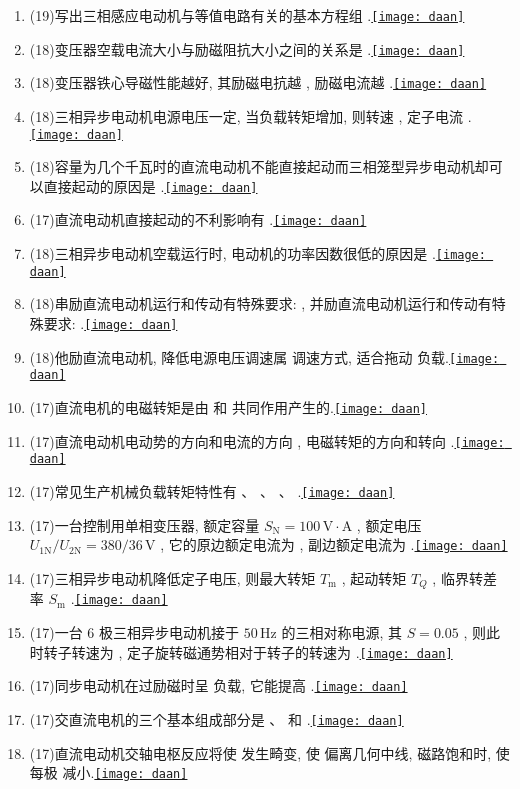 \documentclass[lang=cn,11pt,marginpar=margintrue]{elegantbook}%
\newcommand{\daan}[1]{\hfill\hyperref[#1]{\texttt{[image: daan]}}}
\newcommand{\xiahua}[1]{ \underline{\hspace{#1 pc}} }
\newcommand{\zt}[1]{\,\mathrm{#1}}
\newcommand{\NN}{\mathrm{N}}
\begin{document}
\begin{enumerate}
	\xiahua{8}.\daan{tk:30}
	\item (19)写出三相感应电动机与等值电路有关的基本方程组\xiahua{8}.\daan{tk:31}
	\item (18)变压器空载电流大小与励磁阻抗大小之间的关系是\xiahua{4}.\daan{tk:32}
	\item (18)变压器铁心导磁性能越好, 其励磁电抗越\xiahua{4}, 励磁电流越\xiahua{4}.\daan{tk:33}
	\item (18)三相异步电动机电源电压一定, 当负载转矩增加, 则转速\xiahua{4}, 定子电流\xiahua{4}.\daan{tk:34}
	\item (18)容量为几个千瓦时的直流电动机不能直接起动而三相笼型异步电动机却可以直接起动的原因是\xiahua{8}.\daan{tk:35}
	\item (17)直流电动机直接起动的不利影响有\xiahua{8}.\daan{tk:36}
	\item (18)三相异步电动机空载运行时, 电动机的功率因数很低的原因是\xiahua{5}.\daan{tk:37}
	\item (18)串励直流电动机运行和传动有特殊要求:\xiahua{8}, 并励直流电动机运行和传动有特殊要求:\xiahua{8}.\daan{tk:38}
	\item (18)他励直流电动机, 降低电源电压调速属\xiahua{3}调速方式, 适合拖动\xiahua{3}负载.\daan{tk:39}
	\item (17)直流电机的电磁转矩是由\xiahua{4}和\xiahua{4}共同作用产生的.\daan{tk:40}
	\item (17)直流电动机电动势的方向和电流的方向\xiahua{4}, 电磁转矩的方向和转向\xiahua{4}.\daan{tk:41}
	\item (17)常见生产机械负载转矩特性有\xiahua{5}、\xiahua{5}、\xiahua{5}、\xiahua{5}.\daan{tk:42}
	\item (17)一台控制用单相变压器, 额定容量 $S_{\NN}=100\zt{V\cdot A}$ ,  额定电压 $U_{1\NN}/U_{2\NN}=380/36\zt{V}$ , 它的原边额定电流为\xiahua{4}, 副边额定电流为\xiahua{4}.\daan{tk:43}
	\item (17)三相异步电动机降低定子电压, 则最大转矩 $T_{\mathrm{m}}$ \xiahua{2}, 起动转矩 $T_Q$ \xiahua{2}, 临界转差率 $S_{\mathrm{m}}$ \xiahua{2}.\daan{tk:44}
	\item (17)一台 $6$ 极三相异步电动机接于 $50\zt{Hz}$ 的三相对称电源, 其 $S=0.05$ , 则此时转子转速为\xiahua{4}, 定子旋转磁通势相对于转子的转速为\xiahua{4}.\daan{tk:45}
	\item (17)同步电动机在过励磁时呈\xiahua{4}负载, 它能提高\xiahua{4}.\daan{tk:46}
	\item (17)交直流电机的三个基本组成部分是\xiahua{3}、\xiahua{3}和\xiahua{3}.\daan{tk:47}
	\item (17)直流电动机交轴电枢反应将使\xiahua{8}发生畸变, 使\xiahua{4}偏离几何中线, 磁路饱和时, 使每极\xiahua{4}减小.\daan{tk:48}

\end{enumerate}
\end{document}
